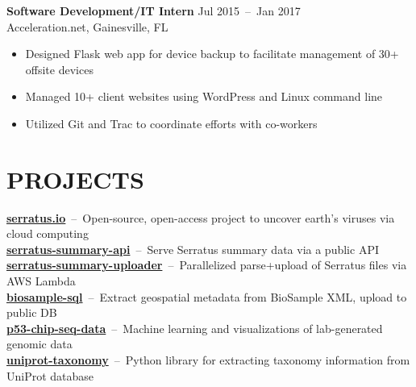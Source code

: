 \documentclass[line,resmargin]{res}
\begin{document}
\begin{resume}
    \textbf{Software Development/IT Intern}    \hfill Jul 2015~--~Jan 2017 \\
    Acceleration.net, Gainesville, FL
    \begin{itemize}  \itemsep -2pt
        \item Designed Flask web app for device backup to facilitate management of 30+ offsite devices
        \item Managed 10+ client websites using WordPress and Linux command line
        \item Utilized Git and Trac to coordinate efforts with co-workers
    \end{itemize}

\section{PROJECTS}
    \textbf{\href{https://serratus.io/}{serratus.io}}~--~Open-source, open-access project to uncover earth's viruses via cloud computing \\
    \textbf{\href{https://github.com/serratus-bio/serratus-summary-api}{serratus-summary-api}}~--~Serve Serratus summary data via a public API \\
    \textbf{\href{https://github.com/serratus-bio/serratus-summary-uploader}{serratus-summary-uploader}}~--~Parallelized parse+upload of Serratus files via AWS Lambda \\
    \textbf{\href{https://github.com/serratus-bio/biosample-sql}{biosample-sql}}~--~Extract geospatial metadata from BioSample XML, upload to public DB \\
    \textbf{\href{https://github.com/zhoulab/p53-chip-seq-data}{p53-chip-seq-data}}~--~Machine learning and visualizations of lab-generated genomic data \\
    \textbf{\href{https://github.com/zhoulab/uniprot-taxonomy}{uniprot-taxonomy}}~--~Python library for extracting taxonomy information from UniProt database \\


\end{resume}
\end{document}
